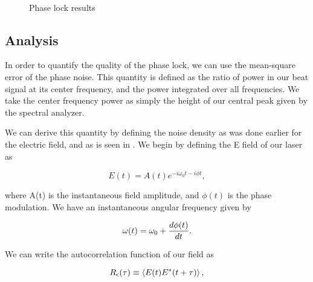 \begin{figure}[!ht]
  \centering
   \\
  \caption[Phase lock results]{ Phase lock results}
  \label{fig:phase_lock_results}
\end{figure}


\subsection{Analysis} 

In order to quantify the quality of the phase lock, we can use the mean-square error of the phase noise.  This quantity is defined as the ratio of power in our beat signal at its center frequency, and the power integrated over all frequencies.  We take the center frequency power as simply the height of our central peak given by the spectral analyzer.  

We can derive this quantity by defining the noise density as was done earlier for the electric field, and as is seen in \cite{zhu1993stabilization}.  We begin by defining the E field of our laser as 

\begin{equation}
  \label{eq:pll_e}
  E(t) = A(t)e^{-i \omega_0 t - i \phi t},
\end{equation}

\noindent
where A(t) is the instantaneous field amplitude, and $\phi(t)$ is the phase modulation.  We have an instantaneous angular frequency given by 

\begin{equation}
  \label{eq:pll_om}
  \omega (t) = \omega_0 + \frac{d \phi(t)}{d t}.
\end{equation}

\noindent
We can write the autocorrelation function of our field as 

\begin{equation}
  \label{eq:pll_ac}
  R_\epsilon (\tau) \equiv \left< E(t)E^*(t+ \tau) \right>,
\end{equation}

